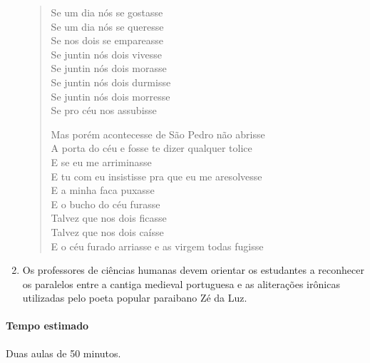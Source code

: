 \documentclass[12pt]{extarticle}
\begin{document}
\begin{enumerate}
\begin{verse} Se um dia nós se gostasse\\ Se um dia nós se queresse\\ Se nos
  dois se empareasse\\ Se juntin nós dois vivesse\\ Se juntin nós dois
  morasse\\ Se juntin nós dois durmisse\\ Se juntin nós dois morresse\\ Se pro
  céu nos assubisse\\\medskip

    Mas porém acontecesse de São Pedro não abrisse\\ A porta do céu e fosse te
    dizer qualquer tolice\\ E se eu me arriminasse\\ E tu com eu insistisse pra
    que eu me aresolvesse\\ E a minha faca puxasse\\ E o bucho do céu furasse\\
    Talvez que nos dois ficasse\\ Talvez que nos dois caísse\\ E o céu furado
  arriasse e as virgem todas fugisse\\ \end{verse}

\item Os professores de ciências humanas devem orientar os estudantes
  a reconhecer os paralelos entre a cantiga medieval portuguesa e as
  aliterações irônicas utilizadas pelo poeta popular paraibano Zé da Luz.

\end{enumerate}

\paragraph{Tempo estimado} Duas aulas de 50 minutos.


\begin{comment} Na obra lida, é feita a oposição entre campo e cidade, e as
  características das pessoas que habitam esses dois ambientes. Nesta temática,
  do homem rural em oposição ao homem urbano, proponha aos alunos, contando com
  o auxílio do professor de ciências humanas, a criação de um mapa. Nele,
  inicialmente divida as regiões em majoritariamente urbanas e rurais. Feito
  isso, aconselha-se buscar notícias e estudos sobre as grandes desigualdades
  e os fatores do deslocamento populacional para as grandes cidades. Com essa
  informação, é possível indicar de maneira gráfica, valendo-se de setas por
  exemplos, caso seja um painel físico, ou por recursos animados, caso o mapa
  esteja sendo produzido virtualmente, os fluxos migratórios estudados. Como
  fonte, também, sugere-se orientar a pesquisa por meio da obra de Patativa do
  Assaré e de outros autores nordestinos.

Para complementar a obra, sugere-se criar xilogravuras a partir da confecção de
carimbos artesanais.  \end{comment}
\end{document}
